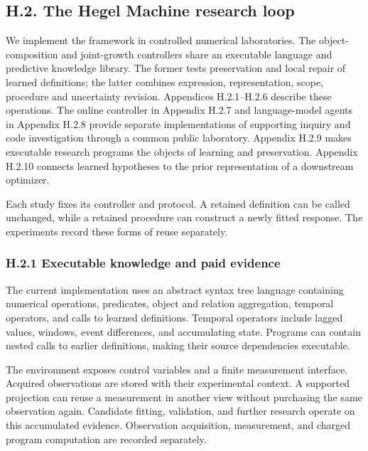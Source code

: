 \documentclass[twoside,11pt]{article}
\begin{document}
\subsection*{H.2. The Hegel Machine research loop}

We implement the framework in controlled numerical laboratories. The
object-composition and joint-growth controllers share an executable language and
predictive knowledge library. The former tests preservation and local repair of
learned definitions; the latter combines expression, representation, scope,
procedure and uncertainty revision. Appendices H.2.1–H.2.6 describe these operations.
The online controller in Appendix H.2.7 and language-model agents in Appendix H.2.8
provide separate implementations of supporting inquiry and code investigation
through a common public laboratory. Appendix H.2.9 makes executable research
programs the objects of learning and preservation. Appendix H.2.10 connects learned
hypotheses to the prior representation of a downstream optimizer.


Each study fixes its controller and protocol. A retained definition can be
called unchanged, while a retained procedure can construct a newly fitted
response. The experiments record these forms of reuse separately.


\subsubsection*{H.2.1 Executable knowledge and paid evidence}

The current implementation uses an abstract syntax tree language containing numerical operations, predicates, object and relation aggregation, temporal operators, and calls to learned definitions. Temporal operators include lagged values, windows, event differences, and accumulating state. Programs can contain nested calls to earlier definitions, making their source dependencies executable.


The environment exposes control variables and a finite measurement interface. Acquired observations are stored with their experimental context. A supported projection can reuse a measurement in another view without purchasing the same observation again. Candidate fitting, validation, and further research operate on this accumulated evidence. Observation acquisition, measurement, and charged program computation are recorded separately.
\end{document}
